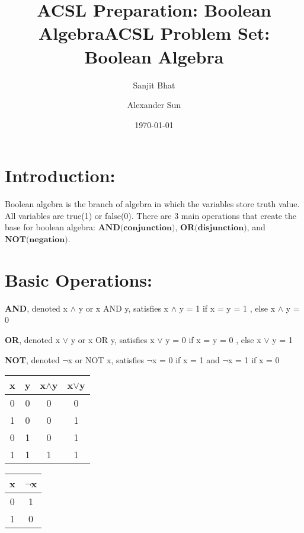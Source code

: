 \documentclass{article}
\title{ACSL Preparation: Boolean Algebra}
\author{Sanjit Bhat \and Alexander Sun}
\date{\today}
\begin{document}
\maketitle

\newpage

\begin{center}
    \title{ACSL Problem Set: Boolean Algebra}
\end{center}

\section{Introduction:}
Boolean algebra is the branch of algebra in which the variables store truth value. All variables are true(1) or false(0).
There are 3 main operations that create the base for boolean algebra: $\textbf{AND(conjunction)}$, $\textbf{OR(disjunction)}$, and $\textbf{NOT(negation)}$. 

\bigskip
\noindent
\section{Basic Operations:}
\textbf{AND}, denoted x $\land$ y or x AND y, satisfies x $\land$ y = 1 if x = y = 1 , else x $\land$ y = 0

\noindent
\textbf{OR}, denoted x $\lor$ y or x OR y, satisfies x $\lor$ y = 0 if x = y = 0 , else x $\lor$ y = 1

\noindent
\textbf{NOT}, denoted $\neg$x or NOT x, satisfies $\neg$x = 0 if x = 1 and $\neg$x = 1 if x = 0

\begin{center}
\begin{tabular}{ |c|c|c|c| } 
 \hline
 x & y & x$\land$y & x$\lor$y \\ 
 \hline
  0 & 0 & 0 & 0 \\ 
 \hline
 1 & 0 & 0 & 1 \\ 
 \hline
 0 & 1 & 0 & 1 \\ 
 \hline
 1 & 1 & 1 & 1 \\ 
 \hline
\end{tabular}
\end{center}

\begin{center}
\begin{tabular}{ |c|c| } 
 \hline
 x & $\neg$x \\ 
 \hline
  0 & 1  \\ 
 \hline
 1 & 0 \\ 
 \hline
\end{tabular}
\end{center}
\end{document}
